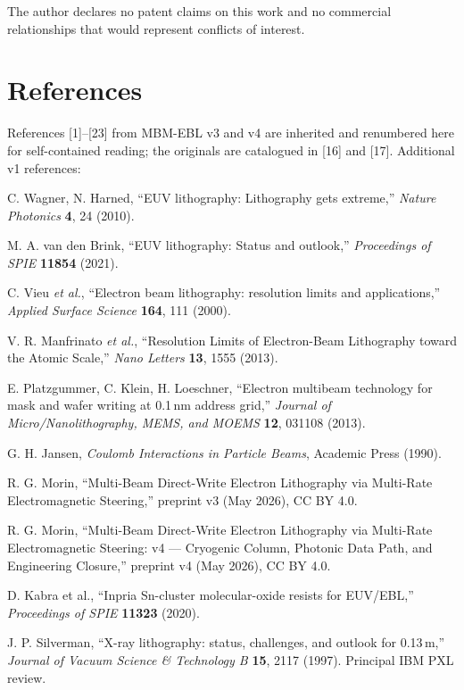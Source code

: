 \documentclass[11pt,letterpaper]{article}
\begin{document}
The author declares no patent claims on this work and no commercial relationships that would represent conflicts of interest.

\section*{References}

References [1]--[23] from MBM-EBL v3 and v4 are inherited and renumbered here for self-contained reading; the originals are catalogued in [16] and [17]. Additional v1 references:

\begin{enumerate}[leftmargin=2.2em,label={[\arabic*]}]
\item C. Wagner, N. Harned, ``EUV lithography: Lithography gets extreme,'' \textit{Nature Photonics} \textbf{4}, 24 (2010).
\item M. A. van den Brink, ``EUV lithography: Status and outlook,'' \textit{Proceedings of SPIE} \textbf{11854} (2021).
\item C. Vieu \textit{et al.}, ``Electron beam lithography: resolution limits and applications,'' \textit{Applied Surface Science} \textbf{164}, 111 (2000).
\item V. R. Manfrinato \textit{et al.}, ``Resolution Limits of Electron-Beam Lithography toward the Atomic Scale,'' \textit{Nano Letters} \textbf{13}, 1555 (2013).
\item E. Platzgummer, C. Klein, H. Loeschner, ``Electron multibeam technology for mask and wafer writing at 0.1\,nm address grid,'' \textit{Journal of Micro/Nanolithography, MEMS, and MOEMS} \textbf{12}, 031108 (2013).
\setcounter{enumi}{9}
\item G. H. Jansen, \textit{Coulomb Interactions in Particle Beams}, Academic Press (1990).
\setcounter{enumi}{15}
\item R. G. Morin, ``Multi-Beam Direct-Write Electron Lithography via Multi-Rate Electromagnetic Steering,'' preprint v3 (May 2026), CC BY 4.0.
\item R. G. Morin, ``Multi-Beam Direct-Write Electron Lithography via Multi-Rate Electromagnetic Steering: v4 --- Cryogenic Column, Photonic Data Path, and Engineering Closure,'' preprint v4 (May 2026), CC BY 4.0.
\setcounter{enumi}{21}
\item D. Kabra et al., ``Inpria Sn-cluster molecular-oxide resists for EUV/EBL,'' \textit{Proceedings of SPIE} \textbf{11323} (2020).
\setcounter{enumi}{23}
\item J. P. Silverman, ``X-ray lithography: status, challenges, and outlook for 0.13\,\textmu m,'' \textit{Journal of Vacuum Science \& Technology B} \textbf{15}, 2117 (1997). Principal IBM PXL review.

\end{enumerate}
\end{document}
